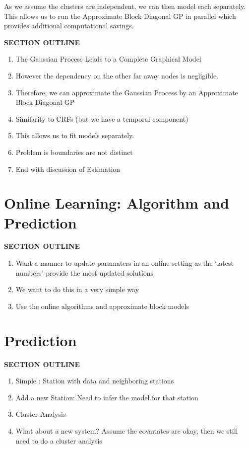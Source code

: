 \documentclass{acm_proc_article-sp}
\begin{document}
As we assume the clusters are independent, we can then model each separately.  This allows us to run the Approximate Block Diagonal GP in parallel which provides additional computational savings.

\vspace{0.25cm}
{\bf SECTION OUTLINE}
\begin{enumerate}
\item The Gaussian Process Leads to a Complete Graphical Model
\item However the dependency on the other far away nodes is negligible.
\item Therefore, we can approximate the Gaussian Process by an Approximate Block Diagonal GP
\item Similarity to CRFs (but we have a temporal component)
\item This allows us to fit models separately.
\item Problem is boundaries are not distinct
\item End with discussion of Estimation
\end{enumerate}
\vspace{0.5cm}

\section{Online Learning: Algorithm and Prediction}

\vspace{0.25cm}
{\bf SECTION OUTLINE}
\begin{enumerate}
\item Want a manner to update paramaters in an online setting as the `latest numbers' provide the most updated solutions
\item We want to do this in a very simple way
\item Use the online algorithms and approximate block models
\end{enumerate}
\vspace{0.5cm}

\section{Prediction}
{\bf SECTION OUTLINE}
\begin{enumerate}
\item Simple : Station with data and neighboring stations
\item Add a new Station:   Need to infer the model for that station
\item Cluster Analysis
\item What about a new system?  Assume the covariates are okay, then we still need to do a cluster analysis
\end{enumerate}
\vspace{0.5cm}
\end{document}
